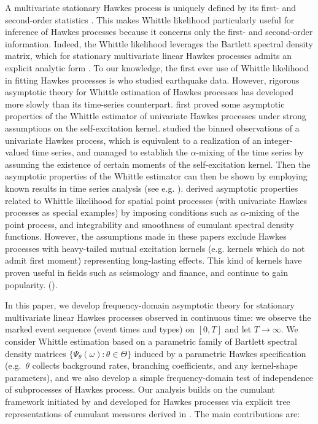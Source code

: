 \documentclass[11pt]{article}
\numberwithin{equation}{section}
\theoremstyle{plain}
\theoremstyle{definition}
\theoremstyle{definition}
\theoremstyle{assumption}
\theoremstyle{proposition}
\theoremstyle{proposition}
\theoremstyle{example}
\theoremstyle{lemma}
\theoremstyle{theorem}
\theoremstyle{remark}
\begin{document}
A multivariate stationary Hawkes process is uniquely defined by its first- and second-order statistics \citep[Corollary 1]{Bacry_and_Muzy2016}. This makes Whittle likelihood particularly useful for inference of Hawkes processes because it concerns only the first- and second-order information. Indeed, the Whittle likelihood leverages the Bartlett spectral density matrix, which for stationary multivariate linear Hawkes processes admits an explicit analytic form \citep[Example 8.3(c)]{Daley_and_Vere-Jones2003}. To our knowledge, the first ever use of Whittle likelihood in fitting Hawkes processes is \citet{Adamopoulos1976} who studied earthquake data. However, rigorous asymptotic theory for Whittle estimation of Hawkes processes has developed more slowly than its time-series counterpart. \citet{Tuan1981} first proved some asymptotic properties of the Whittle estimator of univariate Hawkes processes under strong assumptions on the self-excitation kernel. \citet{Cheysson2022_and_Lang2022} studied the binned observations of a univariate Hawkes process, which is equivalent to a realization of an integer-valued time series, and managed to establish the $\alpha$-mixing of the time series by assuming the existence of certain moments of the self-excitation kernel. Then the asymptotic properties of the Whittle estimator can then be shown by employing known results in time series analysis (see e.g. \citet{Dzhaparidze1986}). \citet{Yang_and_Guan2026} derived asymptotic properties related to Whittle likelihood for spatial point processes (with univariate Hawkes processes as special examples) by imposing conditions such as $\alpha$-mixing of the point process, and integrability and smoothness of cumulant spectral density functions. However, the assumptions made in these papers exclude Hawkes processes with heavy-tailed mutual excitation kernels (e.g. kernels which do not admit first moment) representing long-lasting effects. This kind of kernels have proven useful in fields such as seismology and finance, and continue to gain popularity. (\citealt{Vere-Jones_and_Davies1966, Hawkes2018, Chen_et_al2021, Davis_et_al2024, Dupret_and_Hainaut2025, Gupta_and_Maheshwari2026}).

In this paper, we develop frequency-domain asymptotic theory for stationary multivariate linear Hawkes processes observed in continuous time: we observe the marked event sequence (event times and types) on $[0,T]$ and let $T\to\infty$. We consider Whittle estimation based on a parametric family of Bartlett spectral density matrices $\{\Psi_\theta(\omega):\theta\in\Theta\}$ induced by a parametric Hawkes specification (e.g.\ $\theta$ collects background rates, branching coefficients, and any kernel-shape parameters), and we also develop a simple frequency-domain test of independence of subprocesses of Hawkes process. Our analysis builds on the cumulant framework initiated by \citet{Brillinger1972} and developed for Hawkes processes via explicit tree representations of cumulant measures derived in \citep{Jovanovic_et_al2015}. The main contributions are:
\end{document}
